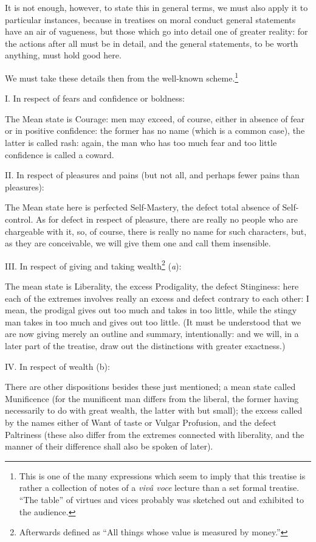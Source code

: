 
It is not enough, however, to state this in general terms, we must also apply
it to particular instances, because in treatises on moral conduct general
statements have an air of vagueness, but those which go into detail one of
greater reality: for the actions after all must be in detail, and the general
statements, to be worth anything, must hold good here.

We must take these details then from the well-known scheme.\footnote{This is one of the many expressions which seem to imply that this treatise is
rather a collection of notes of a \emph{vivâ voce} lecture than a set formal
treatise. “The table” of virtues and vices probably was sketched
out and exhibited to the audience.}

I. In respect of fears and confidence or boldness:

The Mean state is Courage: men may exceed, of course, either in absence of fear
or in positive confidence: the former has no name (which is a common case), the
latter is called rash: again, the man who has too much fear and too little
confidence is called a coward.

II. In respect of pleasures and pains (but not all, and perhaps fewer pains
than pleasures):

The Mean state here is perfected Self-Mastery, the defect total absence of
Self-control. As for defect in respect of pleasure, there are really no people
who are chargeable with it, so, of course, there is really no name for such
characters, but, as they are conceivable, we will give them one and call them
insensible.

III. In respect of giving and taking wealth\footnote{Afterwards defined as “All things whose value is measured by
money.”}
(\emph{a}):

The mean state is Liberality, the excess Prodigality, the defect Stinginess:
here each of the extremes involves really an excess and defect contrary to each
other: I mean, the prodigal gives out too much and takes in too little, while
the stingy man takes in too much and gives out too little. (It must be
understood that we are now giving merely an outline and summary, intentionally:
and we will, in a later part of the treatise, draw out the distinctions with
greater exactness.)

IV. In respect of wealth (b):

There are other dispositions besides these just mentioned; a mean state called
Munificence (for the munificent man differs from the liberal, the former having
necessarily to do with great wealth, the latter with but small); the excess
called by the names either of Want of taste or Vulgar Profusion, and the defect
Paltriness (these also differ from the extremes connected with liberality, and
the manner of their difference shall also be spoken of later).

